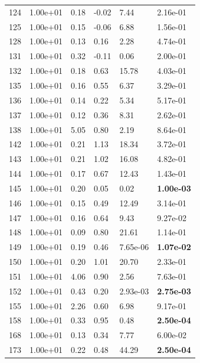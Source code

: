\begin{figure}[htbp!]
{\begin{minipage}[t]{0.48\linewidth}
\begin{tabular}{llllll}
        \midrule
                    124 & 1.00e+01 & 0.18 & -0.02 & 7.44 & 2.16e-01\\
                    125 & 1.00e+01 & 0.15 & -0.06 & 6.88 & 1.56e-01\\
                    128 & 1.00e+01 & 0.13 & 0.16 & 2.28 & 4.74e-01\\
                    131 & 1.00e+01 & 0.32 & -0.11 & 0.06 & 2.00e-01\\
                    132 & 1.00e+01 & 0.18 & 0.63 & 15.78 & 4.03e-01\\
                    135 & 1.00e+01 & 0.16 & 0.55 & 6.37 & 3.29e-01\\
                    136 & 1.00e+01 & 0.14 & 0.22 & 5.34 & 5.17e-01\\
                    137 & 1.00e+01 & 0.12 & 0.36 & 8.31 & 2.62e-01\\
                    138 & 1.00e+01 & 5.05 & 0.80 & 2.19 & 8.64e-01\\
                    142 & 1.00e+01 & 0.21 & 1.13 & 18.34 & 3.72e-01\\
                    143 & 1.00e+01 & 0.21 & 1.02 & 16.08 & 4.82e-01\\
                    144 & 1.00e+01 & 0.17 & 0.67 & 12.43 & 1.43e-01\\
                    145 & 1.00e+01 & 0.20 & 0.05 & 0.02 & \textbf{1.00e-03}\\
                    146 & 1.00e+01 & 0.15 & 0.49 & 12.49 & 3.14e-01\\
                    147 & 1.00e+01 & 0.16 & 0.64 & 9.43 & 9.27e-02\\
                    148 & 1.00e+01 & 0.09 & 0.80 & 21.61 & 1.14e-01\\
                    149 & 1.00e+01 & 0.19 & 0.46 & 7.65e-06 & \textbf{1.07e-02}\\
                    150 & 1.00e+01 & 0.20 & 1.01 & 20.70 & 2.33e-01\\
                    151 & 1.00e+01 & 4.06 & 0.90 & 2.56 & 7.63e-01\\
                    152 & 1.00e+01 & 0.43 & 0.20 & 2.93e-03 & \textbf{2.75e-03}\\
                    155 & 1.00e+01 & 2.26 & 0.60 & 6.98 & 9.17e-01\\
                    158 & 1.00e+01 & 0.33 & 0.95 & 0.48 & \textbf{2.50e-04}\\
                    168 & 1.00e+01 & 0.13 & 0.34 & 7.77 & 6.00e-02\\
                    173 & 1.00e+01 & 0.22 & 0.48 & 44.29 & \textbf{2.50e-04}\\

\end{tabular}
\end{minipage}}
\end{figure}
